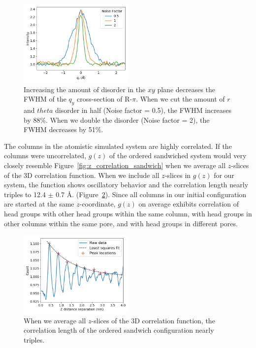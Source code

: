 \documentclass[journal=jpcbfk,manuscript=article]{achemso}
\begin{document}
  \begin{figure}
  \centering
  \includegraphics[width=0.5\textwidth]{qy_fwhm.png}
  \caption{Increasing the amount of disorder in the $xy$ plane decreases the
	  FWHM of the $q_y$ cross-section of R-$\pi$. When we cut the amount of $r$ and
	  $theta$ disorder in half (Noise factor = 0.5), the FWHM increases by 88\%. When
	  we double the disorder (Noise factor = 2), the FWHM decreases by
	  51\%.}\label{fig:qy_fwhm}
  \end{figure}
  
  The columns in the atomistic simulated system are highly correlated. If the columns were
  uncorrelated, $g(z)$ of the ordered sandwiched system would very closely resemble 
  Figure~\ref{fig:z_correlation_sandwich} when we average all $z$-slices of the
  3D correlation function. When we include all $z$-slices in $g(z)$ for our system,
  the function shows oscillatory behavior and the correlation length nearly triples
  to 12.4 $\pm$ 0.7 \AA. (Figure~\ref{fig:z_correlation_fullbox}). Since all 
  columns in our initial configuration are started at the same $z$-coordinate, 
  $g(z)$ on average exhibits correlation of head groups with other head groups
  within the same column, with head groups in other columns within the same pore, 
  and with head groups in different pores.
  
  \begin{figure}
  \centering
  \includegraphics[width=0.5\textwidth]{z_correlation_fullbox.png}
  \caption{When we average all $z$-slices of the 3D correlation function, the 
  correlation length of the ordered sandwich configuration nearly triples.}\label{fig:z_correlation_fullbox}
  \end{figure}
\end{document}
